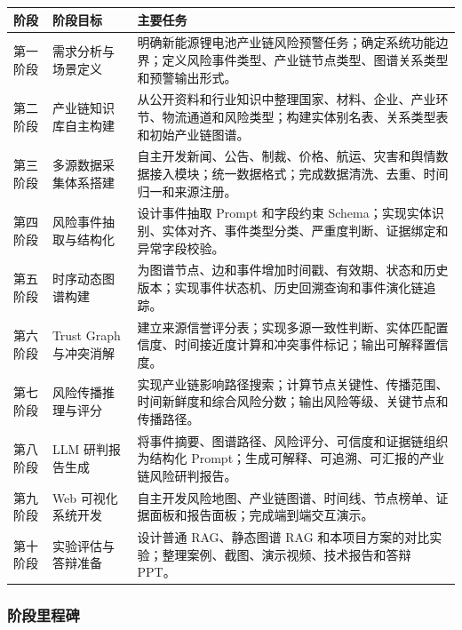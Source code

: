﻿\documentclass[12pt,a4paper]{article}
\begin{document}
\begin{center}
\begin{longtable}{p{2.2cm} p{3.2cm} p{7.2cm}}
\toprule
阶段 & 阶段目标 & 主要任务 \\
\midrule
第一阶段 & 需求分析与场景定义 & 明确新能源锂电池产业链风险预警任务；确定系统功能边界；定义风险事件类型、产业链节点类型、图谱关系类型和预警输出形式。 \\
第二阶段 & 产业链知识库自主构建 & 从公开资料和行业知识中整理国家、材料、企业、产业环节、物流通道和风险类型；构建实体别名表、关系类型表和初始产业链图谱。 \\
第三阶段 & 多源数据采集体系搭建 & 自主开发新闻、公告、制裁、价格、航运、灾害和舆情数据接入模块；统一数据格式；完成数据清洗、去重、时间归一和来源注册。 \\
第四阶段 & 风险事件抽取与结构化 & 设计事件抽取 Prompt 和字段约束 Schema；实现实体识别、实体对齐、事件类型分类、严重度判断、证据绑定和异常字段校验。 \\
第五阶段 & 时序动态图谱构建 & 为图谱节点、边和事件增加时间戳、有效期、状态和历史版本；实现事件状态机、历史回溯查询和事件演化链追踪。 \\
第六阶段 & Trust Graph 与冲突消解 & 建立来源信誉评分表；实现多源一致性判断、实体匹配置信度、时间接近度计算和冲突事件标记；输出可解释置信度。 \\
第七阶段 & 风险传播推理与评分 & 实现产业链影响路径搜索；计算节点关键性、传播范围、时间新鲜度和综合风险分数；输出风险等级、关键节点和传播路径。 \\
第八阶段 & LLM 研判报告生成 & 将事件摘要、图谱路径、风险评分、可信度和证据链组织为结构化 Prompt；生成可解释、可追溯、可汇报的产业链风险研判报告。 \\
第九阶段 & Web 可视化系统开发 & 自主开发风险地图、产业链图谱、时间线、节点榜单、证据面板和报告面板；完成端到端交互演示。 \\
第十阶段 & 实验评估与答辩准备 & 设计普通 RAG、静态图谱 RAG 和本项目方案的对比实验；整理案例、截图、演示视频、技术报告和答辩 PPT。 \\
\bottomrule
\end{longtable}
\end{center}

\subsubsection{阶段里程碑}
\end{document}
